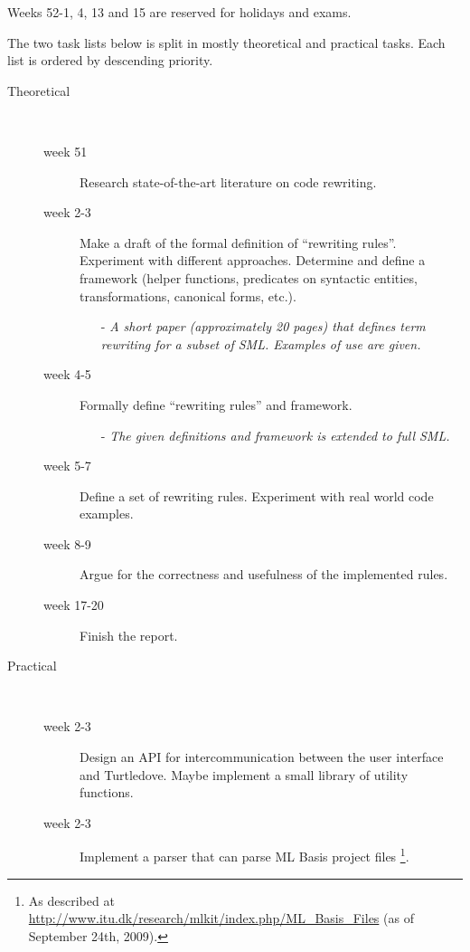 \documentclass[a4paper,oneside,final]{article}
\begin{document}
Weeks 52-1, 4, 13 and 15 are reserved for holidays and exams.

The two task lists below is split in mostly theoretical and practical
tasks. Each list is ordered by descending priority.

\begin{description}
\item[Theoretical]\
  \begin{description}
  \item[week 51] Research state-of-the-art literature on code rewriting.
    
  \item[week 2-3] Make a draft of the formal definition of ``rewriting
    rules''. Experiment with different approaches. Determine and define a
    framework (helper functions, predicates on syntactic entities,
    transformations, canonical forms, etc.).
    \begin{itemize}
    \item[-] \it A short paper (approximately 20 pages) that defines term
      rewriting for a subset of SML. Examples of use are given.
    \end{itemize}
    
  \item[week 4-5] Formally define ``rewriting rules'' and framework.
    \begin{itemize}
    \item[-] \it The given definitions and framework is extended to full SML.
    \end{itemize}
    
  \item[week 5-7] Define a set of rewriting rules. Experiment with real world
    code examples.
    
  \item[week 8-9] Argue for the correctness and usefulness of the implemented
    rules.

  \item[week 17-20] Finish the report.
  \end{description}

\item[Practical]\
  \begin{description}
    
  \item[week 2-3] Design an API for intercommunication between the user
    interface and Turtledove. Maybe implement a small library of utility
    functions.
    
  \item[week 2-3] Implement a parser that can parse ML Basis project files
    \footnote{As described at
      \url{http://www.itu.dk/research/mlkit/index.php/ML_Basis_Files} (as of
      September 24th, 2009).}.
    

\end{description}
\end{description}
\end{document}
